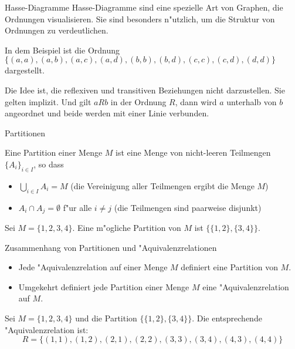 \documentclass{beamer}
\begin{document}
  \begin{frame}{Hasse-Diagramme}
    Hasse-Diagramme sind eine spezielle Art von Graphen, die Ordnungen visualisieren. Sie sind besonders n"utzlich, um die Struktur von Ordnungen zu verdeutlichen.


    In dem Beispiel ist die Ordnung $\{(a,a),(a,b),(a,c),(a,d),(b,b),(b,d),(c,c),(c,d),(d,d)\}$ dargestellt.

    Die Idee ist, die reflexiven und transitiven Beziehungen nicht darzustellen. Sie gelten implizit. Und gilt $aRb$ in der Ordnung $R$, dann wird $a$ unterhalb von $b$ angeordnet und beide werden mit einer Linie verbunden.
    
  \end{frame}
  \begin{frame}{Partitionen}
    \begin{definition}[Partition]
      Eine Partition einer Menge $M$ ist eine Menge von nicht-leeren Teilmengen $\{A_i\}_{i\in I}$, so dass
      \begin{itemize}
        \item $\bigcup_{i\in I} A_i = M$ (die Vereinigung aller Teilmengen ergibt die Menge $M$)
        \item $A_i \cap A_j = \emptyset$ f"ur alle $i \neq j$ (die Teilmengen sind paarweise disjunkt)
      \end{itemize}
    \end{definition}
    \begin{example}
      Sei $M = \{1, 2, 3, 4\}$. Eine m"ogliche Partition von $M$ ist $\{\{1, 2\}, \{3, 4\}\}$.
    \end{example}
  \end{frame}
\begin{frame}{Zusammenhang von Partitionen und "Aquivalenzrelationen}
  \begin{itemize}
    \item Jede "Aquivalenzrelation auf einer Menge $M$ definiert eine Partition von $M$.
    \item Umgekehrt definiert jede Partition einer Menge $M$ eine "Aquivalenzrelation auf $M$.
  \end{itemize}
  \begin{example}
    Sei $M = \{1, 2, 3, 4\}$ und die Partition $\{\{1, 2\}, \{3, 4\}\}$. Die entsprechende "Aquivalenzrelation ist:
    \[
    R = \{(1, 1), (1, 2), (2, 1), (2, 2), (3, 3), (3, 4), (4, 3), (4, 4)\}
    \]
  \end{example}
\end{frame}
\end{document}
